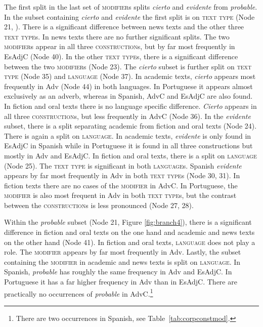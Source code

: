 The first split  in the last set of \textsc{modifier}s   splits \textit{cierto}  and \textit{evidente} from \textit{probable}. In the subset containing \textit{cierto} and \textit{evidente} the first split is on \textsc{text type} (Node 21, ). There is a significant difference between news texts and the other three \textsc{text type}s. In news texts there are no further significant splits. The two \textsc{modifier}s appear in all three \textsc{construction}s, but by far most frequently in EsAdjC (Node 40). In the other \textsc{text type}s, there is a significant difference between the two \textsc{modifier}s (Node 23). The \textit{cierto} subset is further split on \textsc{text type} (Node 35) and  \textsc{language} (Node 37). In academic texts, \textit{cierto} appears most frequently in Adv (Node 44) in both languages. In Portuguese it appears almost exclusively as an adverb, whereas in Spanish, AdvC and EsAdjC are also found. In fiction and oral texts there is no language specific difference. \textit{Cierto} appears in all three \textsc{construction}s, but less frequently in AdvC (Node 36).  In the \textit{evidente} subset, there is a split separating academic from fiction and oral texts (Node 24). There is again  a split on \textsc{language}. In academic texts, \textit{evidente} is only found in EsAdjC in Spanish while in Portuguese it is found in all three constructions but mostly in Adv and EsAdjC. In fiction and oral texts, there is a split on \textsc{language} (Node 25). The \textsc{text type} is significant in both \textsc{language}s. Spanish \textit{evidente} appears by far most frequently in Adv in both \textsc{text type}s (Node 30, 31). In fiction texts there are no cases of the \textsc{modifier} in AdvC. In Portuguese, the \textsc{modifier} is also most frequent in Adv in both \textsc{text type}s, but the contrast between the \textsc{construction}s is less pronounced (Node 27, 28).\largerpage

Within the \textit{probable} subset (Node 21, Figure \ref{fig:branch4}), there is a significant difference in fiction and oral texts on the one hand and academic and news texts on the other hand (Node 41). In fiction and oral texts, \textsc{language} does not play a role. The \textsc{modifier} appears by far most frequently in Adv. Lastly, the subset containing the \textsc{modifier} in academic and news texts is  split on \textsc{language}. In Spanish, \textit{probable} has roughly the same frequency in Adv and EsAdjC. In Portuguese it has a far higher frequency in Adv than in EsAdjC.  There are practically no occurrences of \textit{probable} in AdvC.\footnote{There are two occurrences in Spanish, see Table~\ref{tab:corpconstmod}.} 


